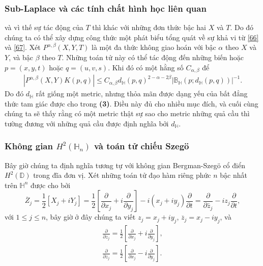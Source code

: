 \documentclass[11pt]{beamer}
\numberwithin{equation}{section}
\theoremstyle{plain}
\theoremstyle{definition}
\theoremstyle{remark}
\begin{document}
\begin{frame}\frametitle{Sub-Laplace và các tính chất hình học liên quan}
và vì thế sự tác động của $T$ thì khác với những đơn thức bậc hai $X$ và $T$. Do đó chúng ta có thể xây dựng công thức một phát biểu tổng quát về sự khả vi từ \eqref{66} và \eqref{67}. Xét ${P^{\alpha ,\beta }}\left( {X,Y,T} \right)$ là một đa thức không giao hoán với bậc $\alpha$ theo $X$ và $Y$, và bậc $\beta$ theo $T$. Những toán tử này có thể tác động đến những biến hoặc $p=\left(x,y,t\right)$ hoặc $q=\left(u,v,s\right)$. Khi đó có một hằng số $C_{\alpha,\beta}$ để
\begin{align}\label{68}
\left| {{P^{\alpha ,\beta }}\left( {X,Y} \right)K\left( {p,q} \right)} \right| \le {C_{\alpha ,\beta }}{d_\mathbb{H}}{\left( {p,q} \right)^{2 - \alpha  - 2\beta }}{\left| {{\mathbb{B}_\mathbb{H}}\left( {p;{d_\mathbb{H}}\left( {p,q} \right)} \right)} \right|^{ - 1}}.
\end{align}
Do đó $d_{\mathbb{H}}$ rất giống một metric, nhưng thỏa mãn được dạng yếu của bất đẳng thức tam giác được cho trong \textbf{(3)}. Điều này đủ cho nhiều mục đích, và cuối cùng chúng ta sẽ thấy rằng có một metric thật sự sao cho metric những quả cầu thì tường đương với những quả cầu được định nghĩa bởi $d_{\mathbb{H}}$.
\end{frame}


\begin{frame}\frametitle{Không gian $H^{2}\left(\mathbb{H}_{n}\right)$ và toán tử chiếu Szeg\"o}
Bây giờ chúng ta định nghĩa tương tự với không gian Bergman-Szeg\"o cổ điển $H^{2}\left(\mathbb{D}\right)$ trong đĩa đơn vị. Xét những toán tử đạo hàm riêng phức $n$  bậc nhất trên $\mathbb{H}^{n}$ được cho bởi 
\[{\overline Z _j} = \frac{1}{2}\left[ {{X_j} + i{Y_j}} \right] = \frac{1}{2}\left[ {\frac{\partial }{{\partial {x_j}}} + i\frac{\partial }{{\partial {y_j}}}} \right] - i\left( {{x_j} + i{y_j}} \right)\frac{\partial }{{\partial t}} = \frac{\partial }{{\partial {{\bar z}_j}}} - i{z_j}\frac{\partial }{{\partial t}},\]
với $1\le j\le n$, bây giờ ở đây chúng ta viết ${z_j} = {x_j} + i{y_j}$, ${\overline z _j} = {x_j} - i{y_j}$, và 
\[\begin{array}{l}
\frac{\partial }{{\partial {z_j}}} = \frac{1}{2}\left[ {\frac{\partial }{{\partial {x_j}}} + i\frac{\partial }{{\partial {y_j}}}} \right],\\
\frac{\partial }{{\partial {z_j}}} = \frac{1}{2}\left[ {\frac{\partial }{{\partial {x_j}}} - i\frac{\partial }{{\partial {y_j}}}} \right].
\end{array}\]
\end{frame}
\end{document}

